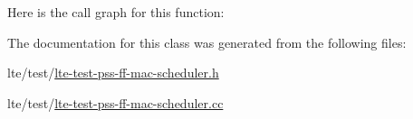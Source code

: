 Here is the call graph for this function\+:




The documentation for this class was generated from the following files\+:\begin{DoxyCompactItemize}
\item 
lte/test/\hyperlink{lte-test-pss-ff-mac-scheduler_8h}{lte-\/test-\/pss-\/ff-\/mac-\/scheduler.\+h}\item 
lte/test/\hyperlink{lte-test-pss-ff-mac-scheduler_8cc}{lte-\/test-\/pss-\/ff-\/mac-\/scheduler.\+cc}\end{DoxyCompactItemize}
